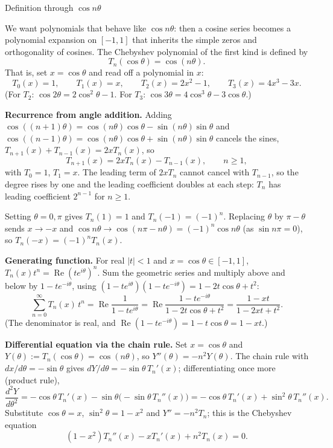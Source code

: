 \documentclass[11pt]{beamer}
\begin{document}
\begin{frame}[allowframebreaks=1.00]{Definition through $\cos n\theta$}
\footnotesize

We want polynomials that behave like $\cos n\theta$: then a cosine series becomes a
polynomial expansion on $[-1,1]$ that inherits the simple zeros and orthogonality of cosines.
The Chebyshev polynomial of the first kind is defined by
\begin{equation}
  T_n(\cos\theta)=\cos(n\theta).
  \label{eq:cheby-def}
\end{equation}
That is, set $x=\cos\theta$ and read off a polynomial in $x$:
\[
  T_0(x)=1,\qquad
  T_1(x)=x,\qquad
  T_2(x)=2x^2-1,\qquad
  T_3(x)=4x^3-3x.
\]
(For $T_2$: $\cos2\theta=2\cos^2\theta-1$.  For $T_3$: $\cos3\theta=4\cos^3\theta-3\cos\theta$.)

\textbf{Recurrence from angle addition.}  Adding
$\cos((n+1)\theta)=\cos(n\theta)\cos\theta-\sin(n\theta)\sin\theta$ and
$\cos((n-1)\theta)=\cos(n\theta)\cos\theta+\sin(n\theta)\sin\theta$ cancels the sines, $T_{n+1}(x)+T_{n-1}(x)=2xT_n(x)$, so
\begin{equation}
  T_{n+1}(x)=2xT_n(x)-T_{n-1}(x),
  \qquad n\ge1,
  \label{eq:cheby-recur}
\end{equation}
with $T_0=1$, $T_1=x$. The leading term of $2xT_n$ cannot cancel with $T_{n-1}$, so
the degree rises by one and the leading coefficient doubles at each step: $T_n$ has
leading coefficient $2^{n-1}$ for $n\ge1$.

Setting $\theta=0,\pi$ gives $T_n(1)=1$ and $T_n(-1)=(-1)^n$.  Replacing $\theta$ by
$\pi-\theta$ sends $x\to-x$ and $\cos n\theta\to\cos(n\pi-n\theta)=(-1)^n\cos n\theta$ (as $\sin n\pi=0$), so
$T_n(-x)=(-1)^nT_n(x)$.

\textbf{Generating function.}  For real $|t|<1$ and $x=\cos\theta\in[-1,1]$,
$T_n(x)t^n=\operatorname{Re}(te^{i\theta})^n$.  Sum the geometric series and multiply above and below by
$1-te^{-i\theta}$, using $(1-te^{i\theta})(1-te^{-i\theta})=1-2t\cos\theta+t^2$:
\begin{equation}
  \sum_{n=0}^{\infty}T_n(x)\,t^{n}
  =\operatorname{Re}\frac{1}{1-te^{i\theta}}
  =\operatorname{Re}\frac{1-te^{-i\theta}}{1-2t\cos\theta+t^{2}}
  =\frac{1-xt}{1-2xt+t^{2}}.
  \label{eq:cheby-gen}
\end{equation}
(The denominator is real, and \(\operatorname{Re}(1-te^{-i\theta})=1-t\cos\theta=1-xt\).)

\textbf{Differential equation via the chain rule.}
Set $x=\cos\theta$ and $Y(\theta):=T_n(\cos\theta)=\cos(n\theta)$, so
$Y''(\theta)=-n^2 Y(\theta)$.  The chain rule with $dx/d\theta=-\sin\theta$ gives
$dY/d\theta=-\sin\theta\,T_n'(x)$; differentiating once more (product rule),
\[
  \frac{d^2Y}{d\theta^2}
  =-\cos\theta\,T_n'(x)-\sin\theta\bigl(-\sin\theta\,T_n''(x)\bigr)
  =-\cos\theta\,T_n'(x)+\sin^2\theta\,T_n''(x).
\]
Substitute $\cos\theta=x$, $\sin^2\theta=1-x^2$ and $Y''=-n^2T_n$; this is the Chebyshev equation
\begin{equation}
  (1-x^2)T_n''(x)-xT_n'(x)+n^2T_n(x)=0.
  \label{eq:cheby-eq}
\end{equation}
\end{frame}
\end{document}
